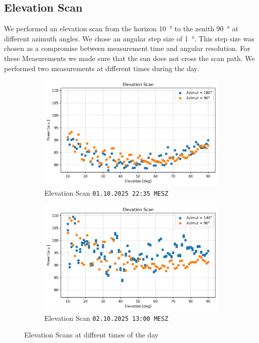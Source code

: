 \subsection{Elevation Scan}
We performed an elevation scan from the horizon \SI{10}{\degree} to the zenith \SI{90}{\degree} at different  azimuth angles. We chose an angular step size of \SI{1}{\degree}. This step size was chosen as a compromise between measurement time and angular resolution. For these Measurements we made sure that the sun does not cross the scan path. We performed two measurements at different times during the day.

\begin{figure}[ht]
\centering
\begin{subfigure}[t]{0.45\textwidth}
    \centering
    \includegraphics[width=\linewidth]{assets/elev_scan_night.png}
    \caption{Elevation Scan \texttt{01.10.2025 22:35 MESZ}}
\end{subfigure}
\begin{subfigure}[t]{0.45\textwidth}
    \centering
    \includegraphics[width=\linewidth]{assets/elev_scan_day.png}
    \caption{Elevation Scan \texttt{02.10.2025 13:00 MESZ}}
\end{subfigure}
\caption{Elevation Scans at diffrent times of the day}
\label{fig:elev_scan}
\end{figure}

